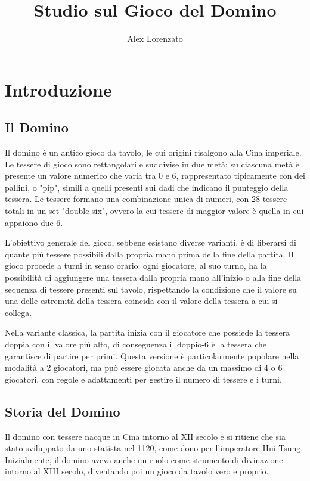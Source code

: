 \documentclass[a4paper,12pt]{report} %
\begin{document}
\title{Studio sul Gioco del Domino}
\author{Alex Lorenzato}
\maketitle

\tableofcontents %

\chapter{Introduzione}

\section{Il Domino}

Il domino è un antico gioco da tavolo, le cui origini risalgono alla Cina imperiale. Le tessere di gioco sono rettangolari e suddivise in due metà; su ciascuna metà è presente un valore numerico che varia tra 0 e 6, rappresentato tipicamente con dei pallini, o "pip", simili a quelli presenti sui dadi che indicano il punteggio della tessera. Le tessere formano una combinazione unica di numeri, con 28 tessere totali in un set "double-six", ovvero la cui tessere di maggior valore è quella in cui appaiono due 6.

L'obiettivo generale del gioco, sebbene esistano diverse varianti, è di liberarsi di quante più tessere possibili dalla propria mano prima della fine della partita. Il gioco procede a turni in senso orario: ogni giocatore, al suo turno, ha la possibilità di aggiungere una tessera dalla propria mano all'inizio o alla fine della sequenza di tessere presenti sul tavolo, rispettando la condizione che il valore su una delle estremità della tessera coincida con il valore della tessera a cui si collega. 

Nella variante classica, la partita inizia con il giocatore che possiede la tessera doppia con il valore più alto, di conseguenza il doppio-6 è la tessera che garantisce di partire per primi. Questa versione è particolarmente popolare nella modalità a 2 giocatori, ma può essere giocata anche da un massimo di 4 o 6 giocatori, con regole e adattamenti per gestire il numero di tessere e i turni.

\section{Storia del Domino}

Il domino con tessere nacque in Cina intorno al XII secolo e si ritiene che sia stato sviluppato da uno statista nel 1120, come dono per l'imperatore Hui Tsung. Inizialmente, il domino aveva anche un ruolo come strumento di divinazione intorno al XIII secolo, diventando poi un gioco da tavolo vero e proprio.
\end{document}
